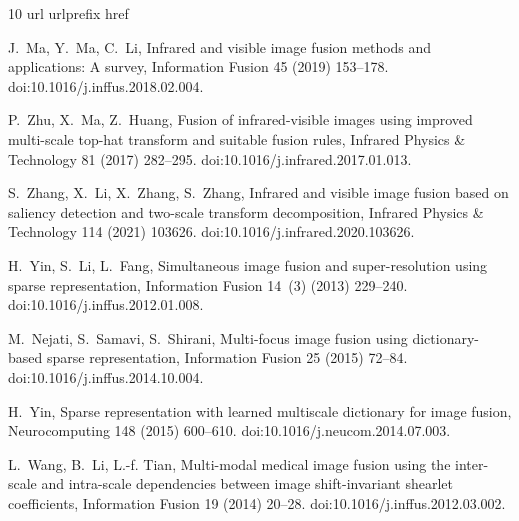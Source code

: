 \begin{thebibliography}{10}
\expandafter\ifx\csname url\endcsname\relax
  \def\url#1{\texttt{#1}}\fi
\expandafter\ifx\csname urlprefix\endcsname\relax\def\urlprefix{URL }\fi
\expandafter\ifx\csname href\endcsname\relax
  \def\href#1#2{#2} \def\path#1{#1}\fi

J.~Ma, Y.~Ma, C.~Li, {Infrared and visible image fusion methods and
  applications: A survey}, Information Fusion 45 (2019) 153--178.
\newblock \href {https://doi.org/10.1016/j.inffus.2018.02.004}
  {\path{doi:10.1016/j.inffus.2018.02.004}}.

P.~Zhu, X.~Ma, Z.~Huang, {Fusion of infrared-visible images using improved
  multi-scale top-hat transform and suitable fusion rules}, Infrared Physics \&
  Technology 81 (2017) 282--295.
\newblock \href {https://doi.org/10.1016/j.infrared.2017.01.013}
  {\path{doi:10.1016/j.infrared.2017.01.013}}.

S.~Zhang, X.~Li, X.~Zhang, S.~Zhang, {Infrared and visible image fusion based
  on saliency detection and two-scale transform decomposition}, Infrared
  Physics \& Technology 114 (2021) 103626.
\newblock \href {https://doi.org/10.1016/j.infrared.2020.103626}
  {\path{doi:10.1016/j.infrared.2020.103626}}.

H.~Yin, S.~Li, L.~Fang, {Simultaneous image fusion and super-resolution using
  sparse representation}, Information Fusion 14~(3) (2013) 229--240.
\newblock \href {https://doi.org/10.1016/j.inffus.2012.01.008}
  {\path{doi:10.1016/j.inffus.2012.01.008}}.

M.~Nejati, S.~Samavi, S.~Shirani, {Multi-focus image fusion using
  dictionary-based sparse representation}, Information Fusion 25 (2015) 72--84.
\newblock \href {https://doi.org/10.1016/j.inffus.2014.10.004}
  {\path{doi:10.1016/j.inffus.2014.10.004}}.

H.~Yin, {Sparse representation with learned multiscale dictionary for image
  fusion}, Neurocomputing 148 (2015) 600--610.
\newblock \href {https://doi.org/10.1016/j.neucom.2014.07.003}
  {\path{doi:10.1016/j.neucom.2014.07.003}}.

L.~Wang, B.~Li, L.-f. Tian, {Multi-modal medical image fusion using the
  inter-scale and intra-scale dependencies between image shift-invariant
  shearlet coefficients}, Information Fusion 19 (2014) 20--28.
\newblock \href {https://doi.org/10.1016/j.inffus.2012.03.002}
  {\path{doi:10.1016/j.inffus.2012.03.002}}.


\end{thebibliography}
